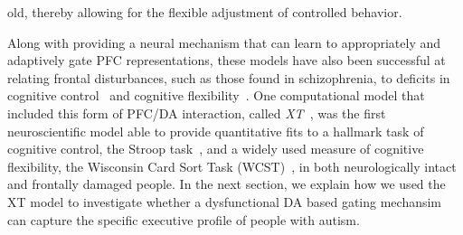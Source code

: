 old, thereby allowing for the flexible adjustment of controlled behavior.

Along with providing a neural mechanism that can learn to appropriately and adaptively gate PFC representations, these models have also been successful at relating frontal disturbances, such as those found in schizophrenia, to deficits in cognitive control~\cite{CohenJD:1992:Schizophrenia} and cognitive flexibility~\cite{BraverTS:1999:Schizophrenia,OReillyRC:2002:IDED}. One computational model that included this form of PFC/DA interaction, called \emph{XT}~\cite{RougierNP:2005:XT}, was the first neuroscientific model able to provide quantitative fits to a hallmark task of cognitive control, the Stroop task~\cite{StroopJR:1935:Interference}, and a widely used measure of cognitive flexibility, the Wisconsin Card Sort Task (WCST)~\cite{BergEA:1948:WCST}, in both neurologically intact and frontally damaged people. In the next section, we explain how we used the XT model to investigate whether a dysfunctional DA based gating mechansim can capture the specific executive profile of people with autism.
